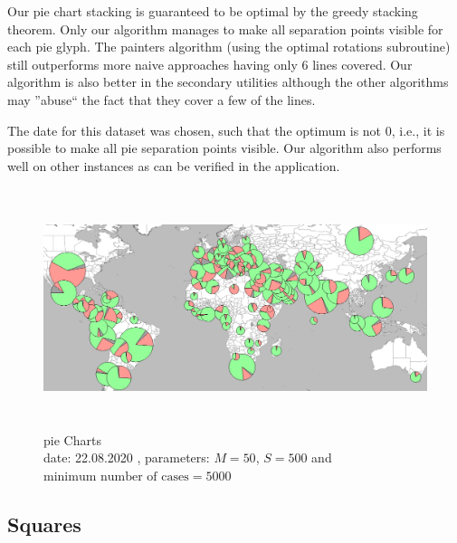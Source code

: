 \documentclass[a4paper,11pt]{article}
\begin{document}
Our pie chart stacking is guaranteed to be optimal by the greedy stacking theorem. Only our algorithm manages to make all separation points visible for each pie glyph. The painters algorithm (using the optimal rotations subroutine) still outperforms more naive approaches having only 6 lines covered. Our algorithm is also better in the secondary utilities although the other algorithms may ''abuse`` the fact that they cover a few of the lines.

The date for this dataset was chosen, such that the optimum is not $0$, i.e., it is possible to make all pie separation points visible. Our algorithm also performs well on other instances as can be verified in the application.

\begin{figure}[!h]
  \centering
  \includegraphics[height=7cm]{assets/pieChartsEval}
  \caption{pie Charts\\
    date: 22.08.2020  , parameters: $M=50$, $S=500$ and $\text{minimum number of cases}=5000$  }
\end{figure}

\subsection*{Squares}
\end{document}
